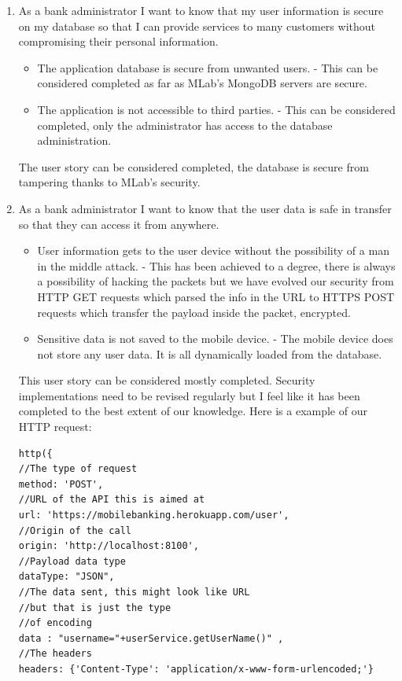 \begin{itemize}
        \begin{enumerate}
        \item As a bank administrator I want to know that my user information is secure on my database so that I can provide services to many customers without compromising their personal information.
        \begin{itemize}
                \item The application database is secure from unwanted users. - This can be considered completed as far as MLab's MongoDB servers are secure.
                \item The application is not accessible to third parties. - This can be considered completed, only the administrator has access to the database administration.
            \end{itemize}
            The user story can be considered completed,  the database is secure from tampering thanks to MLab's security.
        \item As a bank administrator I want to know that the user data is safe in transfer so that they can access it from anywhere.
            \begin{itemize}
                \item User information gets to the user device without the possibility of a man in the middle attack. - This has been achieved to a degree, there is always a possibility of hacking the packets but we have evolved our security from HTTP GET requests which parsed the info in the URL to HTTPS POST requests which transfer the payload inside the packet, encrypted.
                \item Sensitive data is not saved to the mobile device. - The mobile device does not store any user data. It is all dynamically loaded from the database.
            \end{itemize}
            This user story can be considered mostly completed. Security implementations need to be revised regularly but I feel like it has been completed to the best extent of our knowledge.
            Here is a example of our HTTP request:
\begin{verbatim}
http({
//The type of request
method: 'POST',
//URL of the API this is aimed at
url: 'https://mobilebanking.herokuapp.com/user',
//Origin of the call
origin: 'http://localhost:8100',
//Payload data type
dataType: "JSON",
//The data sent, this might look like URL
//but that is just the type
//of encoding
data : "username="+userService.getUserName()" ,
//The headers
headers: {'Content-Type': 'application/x-www-form-urlencoded;'}

\end{verbatim}
\end{enumerate}
\end{itemize}
